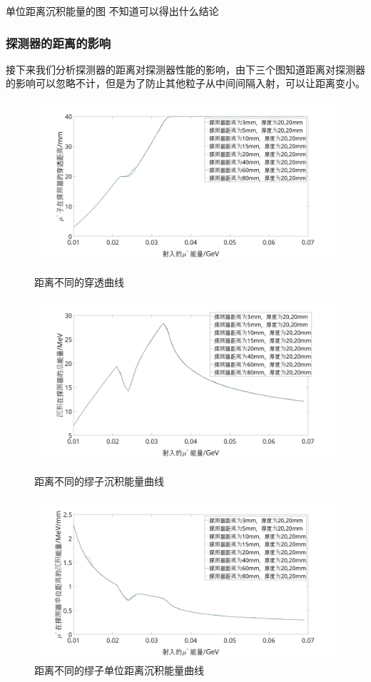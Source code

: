 \documentclass[UTF8]{ctexart}
\begin{document}
单位距离沉积能量的图 不知道可以得出什么结论


\subsubsection{探测器的距离的影响}

接下来我们分析探测器的距离对探测器性能的影响，由下三个图知道距离对探测器的影响可以忽略不计，但是为了防止其他粒子从中间间隔入射，可以让距离变小。\\

\begin{figure}[H]
\centering
    \includegraphics[width=120mm,height=60mm]{pic/dis_all.jpg}
    \caption{距离不同的穿透曲线}
    \includegraphics[width=120mm,height=60mm]{pic/en_all.jpg}
    \caption{距离不同的缪子沉积能量曲线}
    \includegraphics[width=120mm,height=60mm]{pic/en_dis_all.jpg}
    \caption{距离不同的缪子单位距离沉积能量曲线}
\end{figure}
\end{document}
